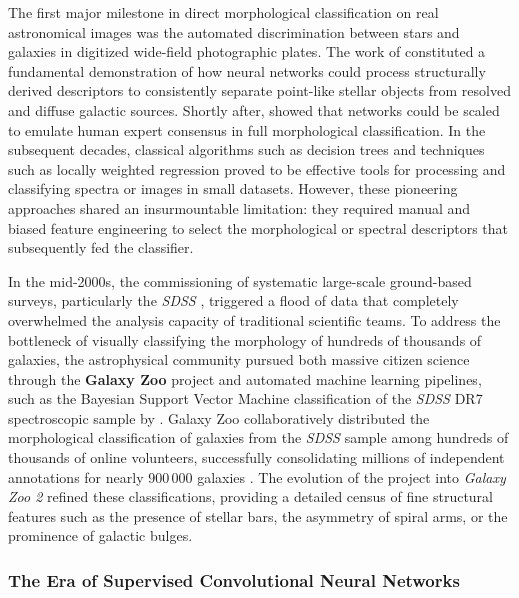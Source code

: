 The first major milestone in direct morphological classification on real astronomical images was the automated discrimination between stars and galaxies in digitized wide-field photographic plates. The work of \textcite{ar:odewahn-1992} constituted a fundamental demonstration of how neural networks could process structurally derived descriptors to consistently separate point-like stellar objects from resolved and diffuse galactic sources. Shortly after, \textcite{ar:lahav-1995} showed that networks could be scaled to emulate human expert consensus in full morphological classification. In the subsequent decades, classical algorithms such as decision trees \autocites{ar:owens-1996}{ar:bazell-2001} and techniques such as locally weighted regression \autocite{ar:calleja-2004} proved to be effective tools for processing and classifying spectra or images in small datasets. However, these pioneering approaches shared an insurmountable limitation: they required manual and biased feature engineering to select the morphological or spectral descriptors that subsequently fed the classifier.

In the mid-2000s, the commissioning of systematic large-scale ground-based surveys, particularly the \textit{\gls{SDSS}} \autocite{ar:york-2000}, triggered a flood of data that completely overwhelmed the analysis capacity of traditional scientific teams. To address the bottleneck of visually classifying the morphology of hundreds of thousands of galaxies, the astrophysical community pursued both massive citizen science through the \textbf{Galaxy Zoo} project \autocite{ar:lintott-2008} and automated machine learning pipelines, such as the Bayesian Support Vector Machine classification of the \textit{\gls{SDSS}} DR7 spectroscopic sample by \textcite{ar:huertas-company-2011}. Galaxy Zoo collaboratively distributed the morphological classification of galaxies from the \textit{\gls{SDSS}} sample among hundreds of thousands of online volunteers, successfully consolidating millions of independent annotations for nearly $900\,000$ galaxies \autocite{ar:lintott-2011}. The evolution of the project into \textit{Galaxy Zoo 2} \autocite{ar:willett-2013} refined these classifications, providing a detailed census of fine structural features such as the presence of stellar bars, the asymmetry of spiral arms, or the prominence of galactic bulges.

\subsubsection{The Era of Supervised Convolutional Neural Networks}

